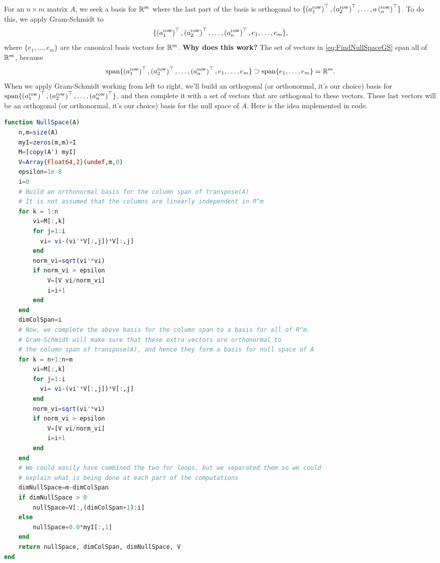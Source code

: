 \vspace*{.2cm}

For an $n \times m$ matrix $A$, we seek a basis for $\mathbb R^m$ where the last part of the basis is orthogonal to $\{  \left(a^{\rm row}_1\right)^\top,  \left(a^{\rm row}_2\right)^\top, \ldots,  a \left(^{\rm row}_n \right)^\top \}$. To do this, we apply Gram-Schmidt to
\begin{equation}
\label{eq:FindNullSpaceGS}
    \{ \left(a^{\rm row}_1\right)^\top,  \left(a^{\rm row}_2\right)^\top, \ldots, \left(a^{\rm row}_n \right)^\top, e_1, \ldots, e_m \}, 
\end{equation}
where $\{e_1, \ldots, e_m \}$ are the canonical basis vectors for $\mathbb R^m$. \textbf{Why does this work?} The set of vectors in \eqref{eq:FindNullSpaceGS} span all of $\mathbb R^m$, because 
$$\mathrm{span} \{ \left(a^{\rm row}_1\right)^\top,  \left(a^{\rm row}_2\right)^\top, \ldots,   \left(a^{\rm row}_n \right)^\top, e_1, \ldots, e_m \} \supset \mathrm{span} \{ e_1, \ldots, e_m \} = \mathbb R^m. $$
When we apply Gram-Schmidt working from left to right, we'll build an orthogonal (or orthonormal, it's our choice) basis for $\mathrm{span} \{ \left(a^{\rm row}_1\right)^\top,  \left(a^{\rm row}_2\right)^\top, \ldots,   \left(a^{\rm row}_n \right)^\top \} $, and then complete it with a set of vectors that are orthogonal to these vectors. These last vectors will be an orthogonal (or orthonormal, it's our choice) basis for the null space of $A$. Here is the idea implemented in code.

\vspace*{0.2cm}
\begin{lstlisting}[language=Julia,style=mystyle]
function NullSpace(A)
    n,m=size(A)
    myI=zeros(m,m)+I
    M=[copy(A') myI]
    V=Array{Float64,2}(undef,m,0)
    epsilon=1e-8
    i=0
    # Build an orthonormal basis for the column span of transpose(A)  
    # It is not assumed that the columns are linearly independent in R^m
    for k = 1:n
        vi=M[:,k]
        for j=1:i
          vi= vi-(vi'*V[:,j])*V[:,j]
        end
        norm_vi=sqrt(vi'*vi)
        if norm_vi > epsilon
            V=[V vi/norm_vi]
            i=i+1
        end            
    end
    dimColSpan=i
    # Now, we complete the above basis for the column span to a basis for all of R^m. 
    # Gram-Schmidt will make sure that these extra vectors are orthonormal to 
    # the column span of transpose(A), and hence they form a basis for null space of A
    for k = n+1:n+m
        vi=M[:,k]
        for j=1:i
          vi= vi-(vi'*V[:,j])*V[:,j]
        end
        norm_vi=sqrt(vi'*vi)
        if norm_vi > epsilon
            V=[V vi/norm_vi]
            i=i+1
        end            
    end
    # We could easily have combined the two for loops, but we separated them so we could
    # explain what is being done at each part of the computations
    dimNullSpace=m-dimColSpan
    if dimNullSpace > 0
        nullSpace=V[:,(dimColSpan+1):i]
    else
        nullSpace=0.0*myI[:,1]
    end
    return nullSpace, dimColSpan, dimNullSpace, V
end
 \end{lstlisting}


